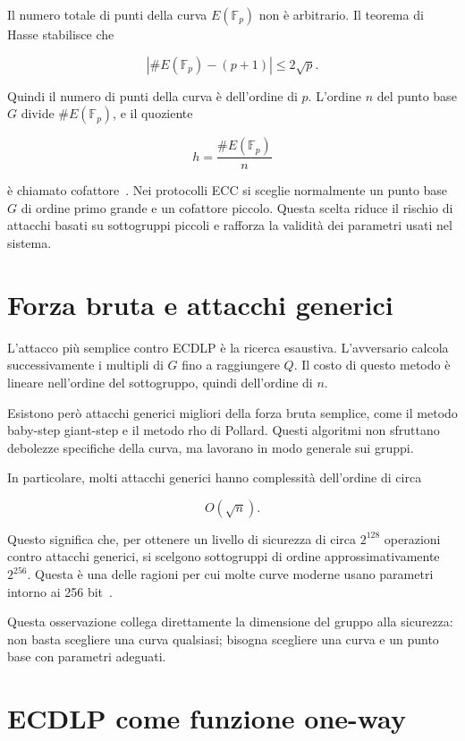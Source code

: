 \documentclass[12pt,a4paper,oneside]{report}
\begin{document}
Il numero totale di punti della curva \(E(\mathbb{F}_p)\) non è arbitrario. Il teorema di Hasse stabilisce che

\[
\left|\#E(\mathbb{F}_p)-(p+1)\right|\leq 2\sqrt{p}.
\]

Quindi il numero di punti della curva è dell'ordine di \(p\). L'ordine \(n\) del punto base \(G\) divide \(\#E(\mathbb{F}_p)\), e il quoziente

\[
h=\frac{\#E(\mathbb{F}_p)}{n}
\]

è chiamato cofattore~\cite{margara_ec,sec1}. Nei protocolli ECC si sceglie normalmente un punto base \(G\) di ordine primo grande e un cofattore piccolo. Questa scelta riduce il rischio di attacchi basati su sottogruppi piccoli e rafforza la validità dei parametri usati nel sistema.

\section{Forza bruta e attacchi generici}

L'attacco più semplice contro ECDLP è la ricerca esaustiva. L'avversario calcola successivamente i multipli di \(G\) fino a raggiungere \(Q\). Il costo di questo metodo è lineare nell'ordine del sottogruppo, quindi dell'ordine di \(n\).

Esistono però attacchi generici migliori della forza bruta semplice, come il metodo baby-step giant-step e il metodo rho di Pollard. Questi algoritmi non sfruttano debolezze specifiche della curva, ma lavorano in modo generale sui gruppi.

In particolare, molti attacchi generici hanno complessità dell'ordine di circa

\begin{equation}
    O(\sqrt{n}).
\end{equation}

Questo significa che, per ottenere un livello di sicurezza di circa \(2^{128}\) operazioni contro attacchi generici, si scelgono sottogruppi di ordine approssimativamente \(2^{256}\). Questa è una delle ragioni per cui molte curve moderne usano parametri intorno ai 256 bit~\cite{nist_sp800_57,sec1}.

Questa osservazione collega direttamente la dimensione del gruppo alla sicurezza: non basta scegliere una curva qualsiasi; bisogna scegliere una curva e un punto base con parametri adeguati.

\section{ECDLP come funzione one-way}
\end{document}
